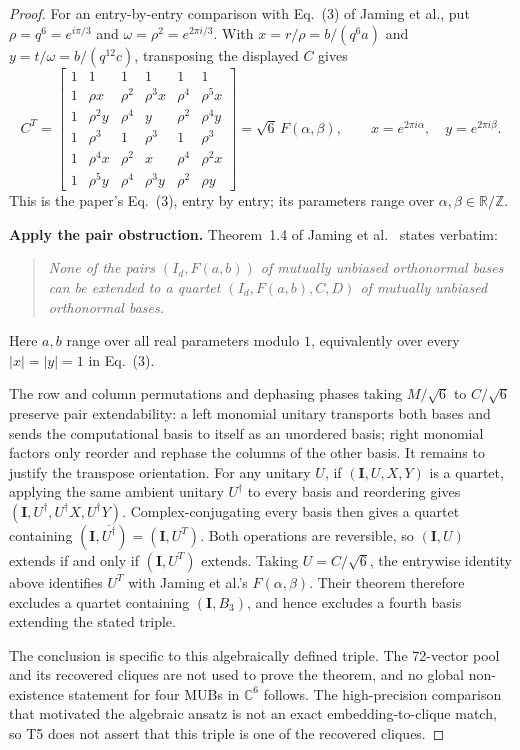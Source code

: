 \begin{proof}
For an entry-by-entry comparison with Eq.~(3) of Jaming et al., put $\rho=q^6=e^{i\pi/3}$ and $\omega=\rho^2=e^{2\pi i/3}$. With $x=r/\rho=b/(q^6a)$ and $y=t/\omega=b/(q^{12}c)$, transposing the displayed $C$ gives
\[
C^T=\begin{bmatrix}
1&1&1&1&1&1\\
1&\rho x&\rho^2&\rho^3x&\rho^4&\rho^5x\\
1&\rho^2y&\rho^4&y&\rho^2&\rho^4y\\
1&\rho^3&1&\rho^3&1&\rho^3\\
1&\rho^4x&\rho^2&x&\rho^4&\rho^2x\\
1&\rho^5y&\rho^4&\rho^3y&\rho^2&\rho y
\end{bmatrix}=\sqrt6\,F(\alpha,\beta),
\qquad x=e^{2\pi i\alpha},\quad y=e^{2\pi i\beta}.
\]
This is the paper's Eq.~(3), entry by entry; its parameters range over $\alpha,\beta\in\mathbb{R}/\mathbb{Z}$.

\textbf{Apply the pair obstruction.} Theorem~1.4 of Jaming et al.~\cite{Jaming2009} states verbatim: \begin{quote}\emph{None of the pairs $(I_d,F(a,b))$ of mutually unbiased orthonormal bases can be extended to a quartet $(I_d,F(a,b),C,D)$ of mutually unbiased orthonormal bases.}\end{quote} Here $a,b$ range over all real parameters modulo $1$, equivalently over every $|x|=|y|=1$ in Eq.~(3).

The row and column permutations and dephasing phases taking $M/\sqrt6$ to $C/\sqrt6$ preserve pair extendability: a left monomial unitary transports both bases and sends the computational basis to itself as an unordered basis; right monomial factors only reorder and rephase the columns of the other basis. It remains to justify the transpose orientation. For any unitary $U$, if $(\mathbf{I},U,X,Y)$ is a quartet, applying the same ambient unitary $U^\dagger$ to every basis and reordering gives $(\mathbf{I},U^\dagger,U^\dagger X,U^\dagger Y)$. Complex-conjugating every basis then gives a quartet containing $(\mathbf{I},\overline{U^\dagger})=(\mathbf{I},U^T)$. Both operations are reversible, so $(\mathbf{I},U)$ extends if and only if $(\mathbf{I},U^T)$ extends. Taking $U=C/\sqrt6$, the entrywise identity above identifies $U^T$ with Jaming et al.'s $F(\alpha,\beta)$. Their theorem therefore excludes a quartet containing $(\mathbf{I},B_3)$, and hence excludes a fourth basis extending the stated triple.

The conclusion is specific to this algebraically defined triple. The 72-vector pool and its recovered cliques are not used to prove the theorem, and no global non-existence statement for four MUBs in $\mathbb{C}^6$ follows. The high-precision comparison that motivated the algebraic ansatz is not an exact embedding-to-clique match, so T5 does not assert that this triple is one of the recovered cliques.
\end{proof}
